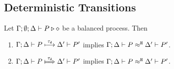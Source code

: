 




\subsection{Deterministic Transitions}
\label{app:sub_tau_inert}



\begin{proposition}
	\label{app:lem:tau_inert}
	Let  $\Gamma; \emptyset; \Delta \vdash P \triangleright \diamond$ be a balanced \HOp process.
	Then
	\begin{enumerate}[1.]
		\item	$\Gamma; \Delta \vdash P \stackrel{\tau_{\mathsf{d}}}{\longmapsto} \Delta' \vdash P'$ implies
			$\Gamma; \Delta \vdash P \approx^\mathtt{H} \Delta' \vdash P'$.
		\item	$\horel{\Gamma}{\Delta}{P}{\Hby{\dtau}}{\Delta'}{P'}$ implies
			$\Gamma; \Delta \vdash P \approx^\mathtt{H} \Delta' \vdash P'$.
	\end{enumerate}
\end{proposition}


